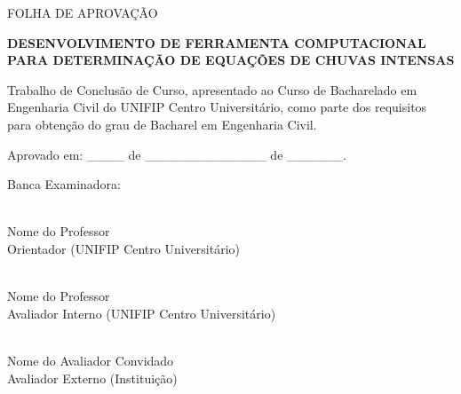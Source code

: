 	\thispagestyle{empty}
	
	\begin{center}
		FOLHA DE APROVAÇÃO
	\end{center}
	
	\vspace{2cm}
	
	\begin{center}
	\textbf{DESENVOLVIMENTO DE FERRAMENTA COMPUTACIONAL PARA DETERMINAÇÃO DE EQUAÇÕES DE CHUVAS INTENSAS}
	\end{center}
	
	\vspace{1.5cm}
	\onehalfspacing
	\noindent Trabalho de Conclusão de Curso, apresentado ao Curso de Bacharelado em Engenharia Civil do UNIFIP Centro Universitário, como parte dos requisitos para obtenção do grau de Bacharel em Engenharia Civil.
	
	\vspace{10pt}
	
	\begin{center}
		Aprovado em: \_\_\_\_ de \_\_\_\_\_\_\_\_\_\_\_\_\_ de \_\_\_\_\_\_.
	\end{center}
	
	\vspace{10pt}
	
	\begin{center}
		Banca Examinadora:
	\end{center}
	
	\vspace{10pt}
	
	\begin{center}
		\hrulefill \\
		Nome do Professor\\
		Orientador (UNIFIP Centro Universitário)
	\end{center}
	
	\vspace{10pt}
	
	\begin{center}
		\hrulefill \\
		Nome do Professor \\
		Avaliador Interno (UNIFIP Centro Universitário)
	\end{center}
	
	\vspace{10pt}
	
	\begin{center}
		\hrulefill \\
		Nome do Avaliador Convidado\\
		Avaliador Externo (Instituição)
	\end{center}
